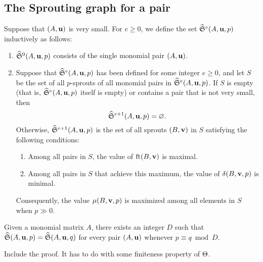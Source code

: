 \documentclass[11pt]{amsart}
\begin{document}
\newpage
\subsection{The Sprouting graph for a pair}
\begin{definition}
   Suppose that $(A, \mathbf{u})$ is very small.
   For $e \geq 0$, we define the set $\widehat{\mathfrak{S}}^e(A,\mathbf{u},p)$ inductively as follows:
\begin{enumerate}
\item $\widehat{\mathfrak{S}}^0(A, \mathbf{u}, p)$ consists of the single monomial pair $(A, \mathbf{u})$.
\item Suppose that $\widehat{\mathfrak{S}}^e(A, \mathbf{u}, p)$ has been defined for some integer $e \geq 0$, and let $S$ be the set of all $p$-sprouts of all monomial pairs in $\widehat{\mathfrak{S}}^e(A, \mathbf{u}, p)$.
If  $S$ is empty (that is, $\widehat{\mathfrak{S}}^e(A, \mathbf{u}, p)$ itself is empty) or contains a pair that is not very small, then \[ \widehat{\mathfrak{S}}^{e+1}(A, \mathbf{u}, p) = \varnothing.\]  
Otherwise, $\widehat{\mathfrak{S}}^{e+1}(A, \mathbf{u}, p)$ is the set of all sprouts $(B, \mathbf{v})$ in $S$ satisfying the following conditions:    

\begin{enumerate}
\item Among all pairs in $S$, the value of  $\operatorname{ft}(B, \mathbf{v})$ is maximal.
\item Among all pairs in $S$ that achieve this maximum, the value of $\delta(B, \mathbf{v}, p)$ is minimal.
\end{enumerate}
Consequently, the value $\mu(B, \mathbf{v},p)$ is maximized among all elements in $S$ when $p \gg 0$. 
\end{enumerate}
\end{definition}


\begin{proposition}
   Given a monomial matrix $A$, there exists an integer $D$ such that $\widehat{\mathfrak{S}}(A, \mathbf{u}, p) = \widehat{\mathfrak{S}}(A, \mathbf{u}, q)$ for every pair $(A, \mathbf{u})$ whenever $p \equiv q \bmod D$.
\end{proposition}

\alert[inline]{Include the proof.  It has to do with some finiteness property of $\Theta$.}


\end{document}
